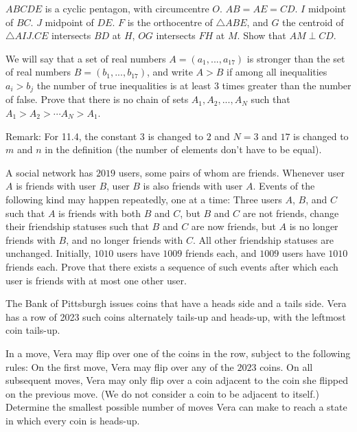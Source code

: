 \documentclass[11pt]{scrartcl}
\begin{document}
\begin{problem}[8811824418974048155]
$ABCDE$ is a cyclic pentagon, with circumcentre $O$. $AB=AE=CD$. $I$ midpoint of $BC$. $J$ midpoint of $DE$. $F$ is the orthocentre of $\triangle ABE$, and $G$ the centroid of $\triangle AIJ$.$CE$ intersects $BD$ at $H$, $OG$ intersects $FH$ at $M$. Show that $AM\perp CD$.
\end{problem}
\begin{problem}[35724831608408]
	We will say that a set of real numbers $A = (a_1,... , a_{17})$ is stronger than the set of real numbers $B = (b_1, . . . , b_{17})$, and write $A >B$ if among all inequalities $a_i > b_j$ the number of true inequalities is at least $3$ times greater than the number of false. Prove that there is no chain of sets $A_1, A_2, .  .  .  , A_N$ such that $A_1>A_2> \cdots A_N>A_1$.

Remark: For 11.4, the constant $3$ is changed to $2$ and $N=3$ and $17$ is changed to $m$ and $n$ in the definition (the number of elements don't have to be equal).
\end{problem}
\begin{problem}[8690567757444826166]
	A social network has $2019$ users, some pairs of whom are friends. Whenever user $A$ is friends with user $B$, user $B$ is also friends with user $A$. Events of the following kind may happen repeatedly, one at a time:
Three users $A$, $B$, and $C$ such that $A$ is friends with both $B$ and $C$, but $B$ and $C$ are not friends, change their friendship statuses such that $B$ and $C$ are now friends, but $A$ is no longer friends with $B$, and no longer friends with $C$. All other friendship statuses are unchanged.
Initially, $1010$ users have $1009$ friends each, and $1009$ users have $1010$ friends each. Prove that there exists a sequence of such events after which each user is friends with at most one other user.

\end{problem}
\begin{problem}[899785005954032]
The Bank of Pittsburgh issues coins that have a heads side and a tails side. Vera has a row of 2023 such coins alternately tails-up and heads-up, with the leftmost coin tails-up.

In a move, Vera may flip over one of the coins in the row, subject to the following rules:
On the first move, Vera may flip over any of the $2023$ coins.
On all subsequent moves, Vera may only flip over a coin adjacent to the coin she flipped on the previous move. (We do not consider a coin to be adjacent to itself.)
Determine the smallest possible number of moves Vera can make to reach a state in which every coin is heads-up.
\end{problem}
\end{document}
